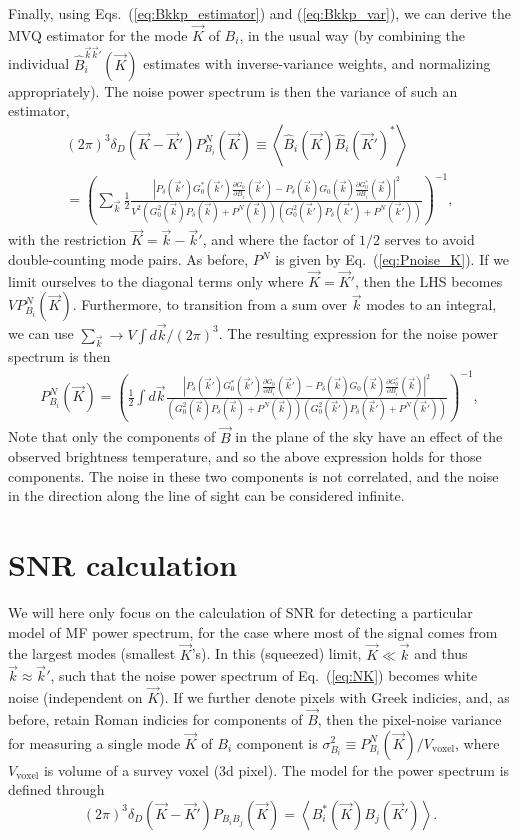 \documentclass[12pt]{paper}
\newcommand{\beq}{\begin{equation}}
\newcommand{\eeq}{\end{equation}}
\newcommand{\bga}{\begin{gathered}}
\newcommand{\ega}{\end{gathered}}
\begin{document}
Finally, using Eqs.~(\ref{eq:Bkkp_estimator}) and (\ref{eq:Bkkp_var}), we can derive the MVQ estimator for the mode $\vec K$ of $B_i$, in the usual way (by combining the individual $\widehat B_i^{\vec k\vec k'}(\vec K)$ estimates with inverse-variance weights, and normalizing appropriately). The noise power spectrum is then the variance of such an estimator,
\beq
\bga
(2\pi)^3\delta_D(\vec K - \vec K') P^N_{B_i}(\vec K) \equiv \left< \widehat B_i(\vec K)\widehat B_i(\vec K')^*\right>\\
= \left( \sum_{\vec k} \frac{1}{2}\frac{\left|P_\delta(\vec k')G_0^*(\vec k')\frac{\partial G_0}{\partial B_i}(\vec k') - P_\delta(\vec k)G_0(\vec k)\frac{\partial G_0^*}{\partial B_i}(\vec k)\right|^2}{V^2\left(G^2_0(\vec k)P_\delta(\vec k) + P^N(\vec k)\right)\left(G^2_0(\vec k')P_\delta(\vec k') + P^N(\vec k')\right) } \right)^{-1},
\ega
\label{eq:NK1}
\eeq
with the restriction $\vec K=\vec k-\vec k'$, and where the factor of $1/2$ serves to avoid double-counting mode pairs. As before, $P^N$ is given by Eq.~(\ref{eq:Pnoise_K}). If we limit ourselves to the diagonal terms only where $\vec K=\vec K'$, then the LHS becomes $V P^N_{B_i}(\vec K)$. Furthermore, to transition from a sum over $\vec k$ modes to an integral, we can use $\sum_{\vec k} \to V\int d\vec k /(2\pi)^3$. The resulting expression for the noise power spectrum is then
\beq
\bga
P^N_{B_i}(\vec K) = \left(\frac{1}{2}\int d{\vec k} \frac{\left|P_\delta(\vec k')G_0^*(\vec k')\frac{\partial G_0}{\partial B_i}(\vec k') - P_\delta(\vec k)G_0(\vec k)\frac{\partial G_0^*}{\partial B_i}(\vec k)\right|^2}{\left(G^2_0(\vec k)P_\delta(\vec k) + P^N(\vec k)\right)\left(G^2_0(\vec k')P_\delta(\vec k') + P^N(\vec k')\right) } \right)^{-1},
\ega
\label{eq:NK}
\eeq
Note that only the components of $\vec B$ in the plane of the sky have an effect of the observed brightness temperature, and so the above expression holds for those components. The noise in these two components is not correlated, and the noise in the direction along the line of sight can be considered infinite.
\section{SNR calculation}
\label{sec:snr}

We will here only focus on the calculation of SNR for detecting a particular model of MF power spectrum, for the case where most of the signal comes from the largest modes (smallest $\vec K$'s). In this (squeezed) limit, $\vec K \ll \vec k$ and thus $\vec k \approx \vec k'$, such that the noise power spectrum of Eq.~(\ref{eq:NK}) becomes white noise (independent on $\vec K$).  If we further denote pixels with Greek indicies, and, as before, retain Roman indicies for components of $\vec B$, then the pixel-noise variance for measuring a single mode $\vec K$ of $B_i$ component is $\sigma_{B_i}^2 \equiv P^N_{B_i}(\vec K)/V_\text{voxel}$, where $V_\text{voxel}$ is volume of a survey voxel (3d pixel). The model for the power spectrum is defined through
\beq
(2\pi)^3\delta_D(\vec K - \vec K') P_{B_iB_j}(\vec K) = \left<B_i^*(\vec K) B_j(\vec K')\right>.
\label{eq:Pbb}
\eeq
\end{document}
